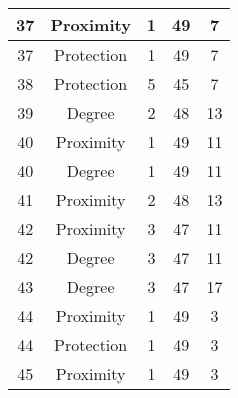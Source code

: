 \documentclass[results.tex]{subfiles}
\begin{document}
\begin{center}
\begin{tabular}{| c || c | c | c | c |}
            \hline
            37                      & Proximity                    & 1                      & 49                      & 7                    \\
            \hline
            37                      & Protection                   & 1                      & 49                      & 7                    \\
            \hline
            38                      & Protection                   & 5                      & 45                      & 7                    \\
            \hline
            39                      & Degree                       & 2                      & 48                      & 13                   \\
            \hline
            40                      & Proximity                    & 1                      & 49                      & 11                   \\
            \hline
            40                      & Degree                       & 1                      & 49                      & 11                   \\
            \hline
            41                      & Proximity                    & 2                      & 48                      & 13                   \\
            \hline
            42                      & Proximity                    & 3                      & 47                      & 11                   \\
            \hline
            42                      & Degree                       & 3                      & 47                      & 11                   \\
            \hline
            43                      & Degree                       & 3                      & 47                      & 17                   \\
            \hline
            44                      & Proximity                    & 1                      & 49                      & 3                    \\
            \hline
            44                      & Protection                   & 1                      & 49                      & 3                    \\
            \hline
            45                      & Proximity                    & 1                      & 49                      & 3                    \\

\end{tabular}
\end{center}
\end{document}
